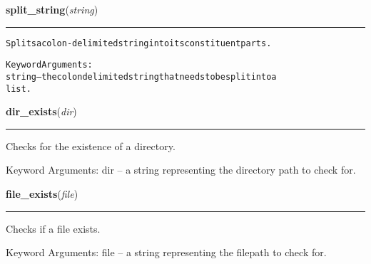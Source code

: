 \hspace{.8\funcindent}\begin{boxedminipage}{\funcwidth}

    \raggedright \textbf{split\_string}(\textit{string})

    \vspace{-1.5ex}

    \rule{\textwidth}{0.5\fboxrule}
\setlength{\parskip}{2ex}
\begin{alltt}
Splits a colon-delimited string into its constituent parts.

Keyword Arguments:
string -- the colon delimited string that needs to be split into a
          list.
\end{alltt}

\setlength{\parskip}{1ex}
    \end{boxedminipage}

    \label{reliafree:utilities:dir_exists}

    \vspace{0.5ex}

\hspace{.8\funcindent}\begin{boxedminipage}{\funcwidth}

    \raggedright \textbf{dir\_exists}(\textit{dir})

    \vspace{-1.5ex}

    \rule{\textwidth}{0.5\fboxrule}
\setlength{\parskip}{2ex}
    Checks for the existence of a directory.

    Keyword Arguments: dir -- a string representing the directory path to 
    check for.

\setlength{\parskip}{1ex}
    \end{boxedminipage}

    \label{reliafree:utilities:file_exists}

    \vspace{0.5ex}

\hspace{.8\funcindent}\begin{boxedminipage}{\funcwidth}

    \raggedright \textbf{file\_exists}(\textit{file})

    \vspace{-1.5ex}

    \rule{\textwidth}{0.5\fboxrule}
\setlength{\parskip}{2ex}
    Checks if a file exists.

    Keyword Arguments: file -- a string representing the filepath to check 
    for.

\setlength{\parskip}{1ex}
    \end{boxedminipage}

